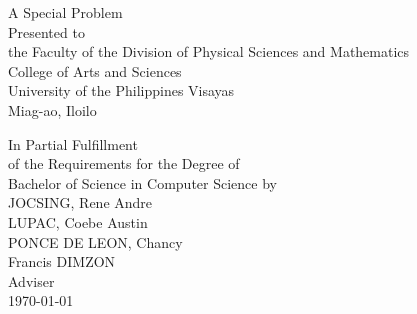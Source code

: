 \begin{titlepage}
\centering


\vspace{1.15cm}
A Special Problem\\
Presented to\\
the Faculty of the Division of Physical Sciences and Mathematics\\
College of Arts and Sciences\\
University of the Philippines Visayas\\
Miag-ao, Iloilo

\vspace{1.15cm}
In Partial Fulfillment\\
of the Requirements for the Degree of\\
Bachelor of Science in Computer Science
\vspace{1.15cm}
by\\

\vspace{1cm}
JOCSING, Rene Andre  \\
LUPAC, Coebe Austin  \\
PONCE DE LEON, Chancy  \\

\vspace{1.15cm}
Francis DIMZON \\
Adviser\\

\vspace{1.15cm}
\today
\end{titlepage}
